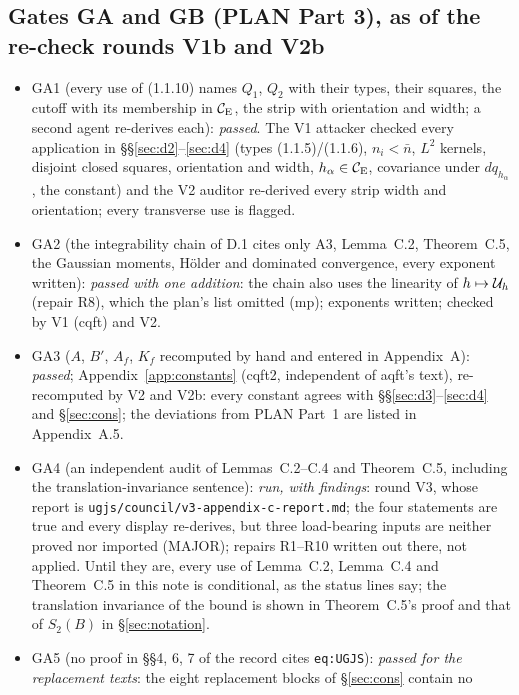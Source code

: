 \subsection*{Gates GA and GB (PLAN Part 3), as of the re-check rounds V1b and V2b}
\begin{itemize}\setlength{\itemsep}{1pt}
\item GA1 (every use of (1.1.10) names $Q_1$, $Q_2$ with their types, their squares, the cutoff with
  its membership in $\mathcal{C}_{\mathrm E}$, the strip with orientation and width; a second agent re-derives each):
  \emph{passed}. The V1 attacker checked every application in \S\S\ref{sec:d2}--\ref{sec:d4}
  (types (1.1.5)/(1.1.6), $n_i<\bar n$, $L^2$ kernels, disjoint closed squares, orientation and
  width, $h_\alpha\in\mathcal{C}_{\mathrm E}$, covariance under $dq_{h_\alpha}$, the constant) and the V2 auditor
  re-derived every strip width and orientation; every transverse use is flagged.
\item GA2 (the integrability chain of D.1 cites only A3, Lemma~C.2, Theorem~C.5, the Gaussian
  moments, H\"older and dominated convergence, every exponent written): \emph{passed with one
  addition}: the chain also uses the linearity of $h\mapsto\mathcal U_h$ (repair R8), which the
  plan's list omitted (mp); exponents written; checked by V1 (cqft) and V2.
\item GA3 ($A$, $B'$, $A_f$, $K_f$ recomputed by hand and entered in Appendix~A): \emph{passed};
  Appendix~\ref{app:constants} (cqft2, independent of aqft's text), re-recomputed by V2 and
  V2b: every constant agrees with \S\S\ref{sec:d3}--\ref{sec:d4} and \S\ref{sec:cons}; the
  deviations from PLAN Part~1 are listed in Appendix~A.5.
\item GA4 (an independent audit of Lemmas~C.2--C.4 and Theorem~C.5, including the
  translation-invariance sentence): \emph{run, with findings}: round V3, whose report is
  \texttt{ugjs/council/}\allowbreak\texttt{v3-appendix-c-report.md}; the four statements are true and every
  display re-derives, but three load-bearing inputs are neither proved nor imported (MAJOR);
  repairs R1--R10 written out there, not applied. Until they are, every use of Lemma~C.2,
  Lemma~C.4 and Theorem~C.5 in this note is conditional, as the status lines say; the
  translation invariance of the bound is shown in Theorem~C.5's proof and that of $S_2(B)$ in
  \S\ref{sec:notation}.
\item GA5 (no proof in \S\S4, 6, 7 of the record cites \texttt{eq:UGJS}): \emph{passed for the
  replacement texts}: the eight replacement blocks of \S\ref{sec:cons} contain no

\end{itemize}
